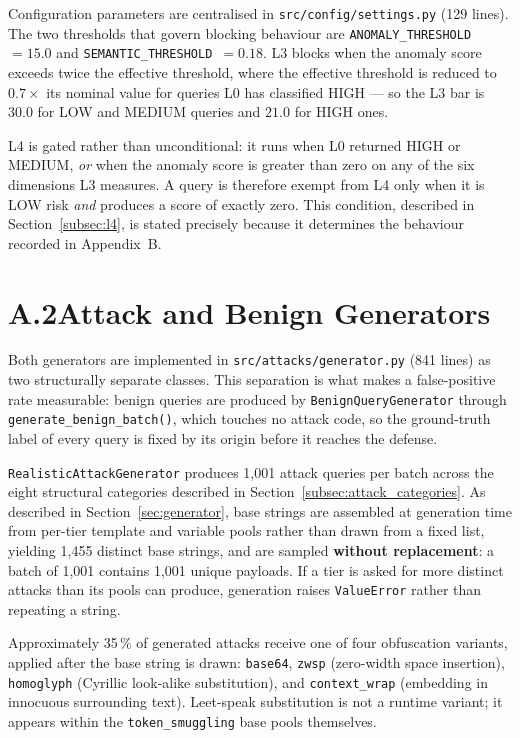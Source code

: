 \noindent
Configuration parameters are centralised in \texttt{src/config/settings.py} (129 lines). The two thresholds that govern blocking behaviour are \texttt{ANOMALY\_THRESHOLD}~$=15.0$ and \texttt{SEMANTIC\_THRESHOLD}~$=0.18$. L3 blocks when the anomaly score exceeds twice the effective threshold, where the effective threshold is reduced to $0.7\times$ its nominal value for queries L0 has classified HIGH --- so the L3 bar is $30.0$ for LOW and MEDIUM queries and $21.0$ for HIGH ones.

L4 is gated rather than unconditional: it runs when L0 returned HIGH or MEDIUM, \emph{or} when the anomaly score is greater than zero on any of the six dimensions L3 measures. A query is therefore exempt from L4 only when it is LOW risk \emph{and} produces a score of exactly zero. This condition, described in Section~\ref{subsec:l4}, is stated precisely because it determines the behaviour recorded in Appendix~B.

\section*{A.2\quad Attack and Benign Generators}

Both generators are implemented in \texttt{src/attacks/generator.py} (841 lines) as two structurally separate classes. This separation is what makes a false-positive rate measurable: benign queries are produced by \texttt{BenignQueryGenerator} through \texttt{generate\_benign\_batch()}, which touches no attack code, so the ground-truth label of every query is fixed by its origin before it reaches the defense.

\texttt{RealisticAttackGenerator} produces 1{,}001 attack queries per batch across the eight structural categories described in Section~\ref{subsec:attack_categories}. As described in Section~\ref{sec:generator}, base strings are assembled at generation time from per-tier template and variable pools rather than drawn from a fixed list, yielding 1{,}455 distinct base strings, and are sampled \textbf{without replacement}: a batch of 1{,}001 contains 1{,}001 unique payloads. If a tier is asked for more distinct attacks than its pools can produce, generation raises \texttt{ValueError} rather than repeating a string.

Approximately 35\,\% of generated attacks receive one of four obfuscation variants, applied after the base string is drawn: \texttt{base64}, \texttt{zwsp} (zero-width space insertion), \texttt{homoglyph} (Cyrillic look-alike substitution), and \texttt{context\_wrap} (embedding in innocuous surrounding text). Leet-speak substitution is not a runtime variant; it appears within the \texttt{token\_smuggling} base pools themselves.

